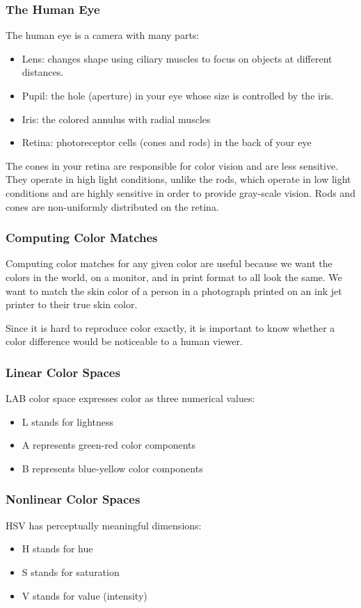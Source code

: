 \documentclass{math}
\begin{document}
\subsubsection*{The Human Eye}
The human eye is a camera with many parts:
\begin{itemize}
  \item Lens: changes shape using ciliary muscles to focus on objects at
    different distances.
  \item Pupil: the hole (aperture) in your eye whose size is controlled by the
    iris.
  \item Iris: the colored annulus with radial muscles
  \item Retina: photoreceptor cells (cones and rods) in the back of your eye
\end{itemize}
The cones in your retina are responsible for color vision and are less
sensitive. They operate in high light conditions, unlike the rods, which operate
in low light conditions and are highly sensitive in order to provide gray-scale
vision. Rods and cones are non-uniformly distributed on the retina.

\subsubsection*{Computing Color Matches}
Computing color matches for any given color are useful because we want the
colors in the world, on a monitor, and in print format to all look the same.
We want to match the skin color of a person in a photograph printed on an ink
jet printer to their true skin color. \par
Since it is hard to reproduce color exactly, it is important to know whether a
color difference would be noticeable to a human viewer.

\subsubsection*{Linear Color Spaces}
LAB color space expresses color as three numerical values:
\begin{itemize}
  \item L stands for lightness
  \item A represents green-red color components
  \item B represents blue-yellow color components
\end{itemize}

\subsubsection*{Nonlinear Color Spaces}
HSV has perceptually meaningful dimensions:
\begin{itemize}
  \item H stands for hue
  \item S stands for saturation
  \item V stands for value (intensity)
\end{itemize}
\end{document}
